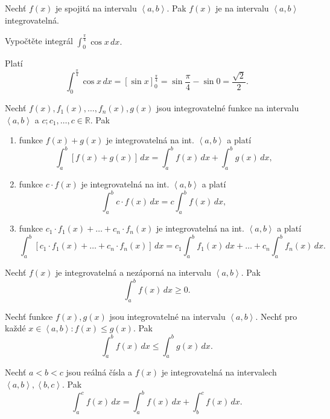 \begin{veta}
Nechť $f(x)$ je spojitá na intervalu $\left < a,b \right > $. Pak $f(x)$ je na
intervalu $\left < a,b \right > $ integrovatelná.
\end{veta}

\begin{priklad}
Vypočtěte integrál $\int_0^{\frac{\pi}{4}}\cos x \, dx.$
\end{priklad}

\begin{reseni}
Platí
$$\int_0^{\frac{\pi}{4}}\cos x \, dx=\left [ \sin x  \right ]_0^{\frac{\pi}{4}}=\sin \frac{\pi}{4}-\sin 0=\frac{\sqrt{2} }{2}. $$
\end{reseni}

\begin{veta}
Nechť $f(x), f_1(x),\dots,f_n(x), g(x)$ jsou integrovatelné funkce na intervalu $\left < a,b \right > $
a $c; c_1,\dots,c\in \mathbb R.$ Pak
\begin{enumerate}[$i.$]
\item funkce $f(x)+g(x)$ je integrovatelná na int. $\left < a,b \right > $ a platí
$$\int _a^b \left [ f(x)+g(x) \right ] \, dx = \int_a ^b f(x)\, dx + \int_a ^b g(x) \, dx,$$
\item funkce $c\cdot f(x)$ je integrovatelná na int. $\left < a,b \right > $ a platí
$$\int _a ^b c\cdot f(x) \, dx = c \int _a ^b f(x)\, dx,$$
\item funkce $c_1\cdot f_1(x) + \dots + c_n \cdot f_n(x)$ je integrovatelná na int. $\left < a,b \right > $ a platí
$$\int_a ^b \left [ c_1\cdot f_1(x) + \dots + c_n \cdot f_n (x) \right ]\, dx = c_1 \int _a ^b f_1(x)\, dx + \dots + c_n \int _a ^b f_n(x)\, dx. $$
\end{enumerate}
\end{veta}

\begin{veta}
Nechť $f(x)$ je integrovatelná a nezáporná na intervalu $\left < a,b \right > $. Pak
$$\int_a ^b f(x) \, dx \geq 0.$$
\end{veta}

\begin{veta}
Nechť funkce $f(x),g(x)$ jsou integrovatelné na intervalu $\left < a,b \right > .$
Nechť pro každé $x\in \left < a,b \right > :f(x)\leq g(x).$ Pak
$$\int_a^b f(x) \, dx \leq \int_a^b g(x) \, dx.$$
\end{veta}

\begin{veta}
Nechť $a<b<c$ jsou reálná čísla a $f(x)$ je integrovatelná na intervalech
$\left < a,b \right >, \left < b,c \right > . $ Pak
$$\int_a^c f(x)\, dx = \int_a^b f(x)\, dx + \int_b^c f(x)\, dx.$$
\end{veta}

